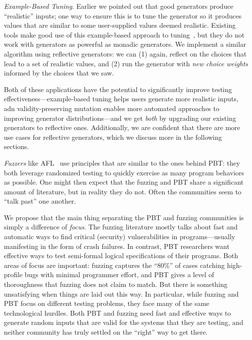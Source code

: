 {\em Example-Based Tuning.} Earlier we pointed out that good generators
produce ``realistic'' inputs; one way to ensure this is to tune the generator so
it produces values that are similar to some user-supplied values deemed
realistic. Existing tools make good use of this example-based approach to
tuning~\cite{soremekun2020inputs}, but they do not work with generators as
powerful as monadic generators. We implement a similar algorithm using
reflective generators: we can (1) again, reflect on the choices that lead to a
set of realistic values, and (2) run the generator with {\em new choice weights}
informed by the choices that we saw.

Both of these applications have the potential to significantly improve testing
effectiveness---example-based tuning helps users generate more realistic inputs,
adn validity-preserving mutation enables more automated approaches to improving
generator distributions---and we get {\em both} by upgrading our existing
generators to reflective ones. Additionally, we are confident that there are
more use cases for reflective generators, which we discuss more in the following
sections.

{\em Fuzzers} like AFL~\cite{afl-readme} use principles that are similar to the
ones behind PBT: they both leverage randomized testing to quickly exercise as
many program behaviors as possible.  One might then expect that the fuzzing and
PBT share a significant amount of literature, but in reality they do not. Often
the communities seem to ``talk past'' one another.

We propose that the main thing separating the PBT and fuzzing communities is
simply a difference of {\em focus}. The fuzzing literature mostly talks about
fast and automatic ways to find critical (security) vulnerabilities in
programs---usually manifesting in the form of crash failures.  In contrast, PBT
researchers want effective ways to test semi-formal logical specifications of
their programs. Both areas of focus are important: fuzzing captures the ``80\%''
of cases catching high-profile bugs with minimal programmer effort, and PBT
gives a level of thoroughness that fuzzing does not claim to match. But there is
something unsatisfying when things are laid out this way. In particular, while
fuzzing and PBT focus on different testing problems, they face many of the same
technological hurdles. Both PBT and fuzzing need fast and effective ways to
generate random inputs that are valid for the systems that they are testing, and
neither community has truly settled on the ``right'' way to get there.

